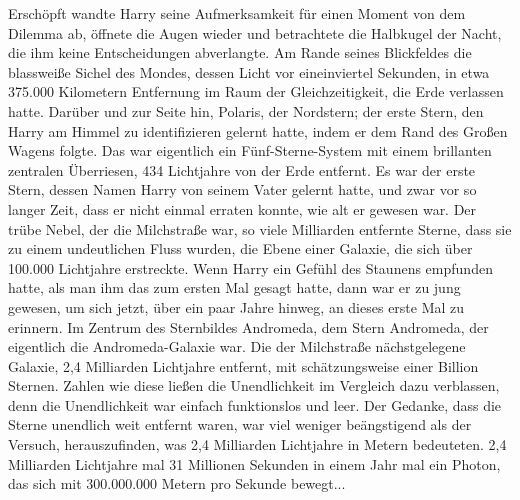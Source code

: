 Erschöpft wandte Harry seine Aufmerksamkeit für einen Moment von dem Dilemma ab,
öffnete die Augen wieder und betrachtete die Halbkugel der Nacht, die ihm keine
Entscheidungen abverlangte. Am Rande seines Blickfeldes die blassweiße Sichel
des Mondes, dessen Licht vor eineinviertel Sekunden, in etwa 375.000 Kilometern
Entfernung im Raum der Gleichzeitigkeit, die Erde verlassen hatte. Darüber und
zur Seite hin, Polaris, der Nordstern; der erste Stern, den Harry am Himmel zu
identifizieren gelernt hatte, indem er dem Rand des Großen Wagens folgte. Das
war eigentlich ein Fünf-Sterne-System mit einem brillanten zentralen Überriesen,
434 Lichtjahre von der Erde entfernt. Es war der erste \glqq{}Stern\grqq{},
dessen Namen Harry von seinem Vater gelernt hatte, und zwar vor so langer Zeit,
dass er nicht einmal erraten konnte, wie alt er gewesen war. Der trübe Nebel,
der die Milchstraße war, so viele Milliarden entfernte Sterne, dass sie zu einem
undeutlichen Fluss wurden, die Ebene einer Galaxie, die sich über 100.000
Lichtjahre erstreckte. Wenn Harry ein Gefühl des Staunens empfunden hatte, als
man ihm das zum ersten Mal gesagt hatte, dann war er zu jung gewesen, um sich
jetzt, über ein paar Jahre hinweg, an dieses erste Mal zu erinnern. Im Zentrum
des Sternbildes Andromeda, dem Stern Andromeda, der eigentlich die
Andromeda-Galaxie war. Die der Milchstraße nächstgelegene Galaxie, 2,4
Milliarden Lichtjahre entfernt, mit schätzungsweise einer Billion Sternen.
Zahlen wie diese ließen die \glqq{}Unendlichkeit\grqq{} im Vergleich dazu
verblassen, denn die \glqq{}Unendlichkeit\grqq{} war einfach funktionslos und
leer. Der Gedanke, dass die Sterne \glqq{}unendlich\grqq{} weit entfernt waren,
war viel weniger beängstigend als der Versuch, herauszufinden, was 2,4
Milliarden Lichtjahre in Metern bedeuteten. 2,4 Milliarden Lichtjahre mal 31
Millionen Sekunden in einem Jahr mal ein Photon, das sich mit 300.000.000 Metern
pro Sekunde bewegt...

